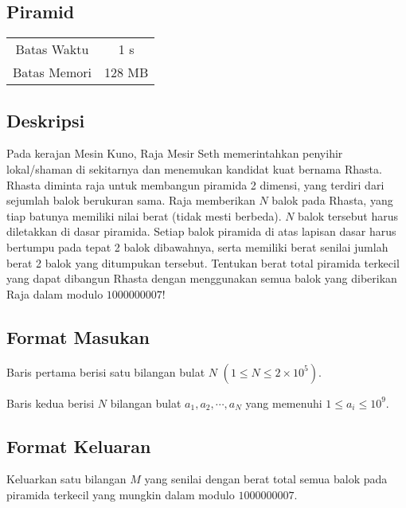 \documentclass{article}
\begin{document}
\begin{center}
    \section*{Piramid} %

    \begin{tabular}{ | c c | }
        \hline
        Batas Waktu  & 1 s \\    %
        Batas Memori & 128 MB \\  %
        \hline
    \end{tabular}
\end{center}

\subsection*{Deskripsi}
Pada kerajan Mesin Kuno, Raja Mesir Seth memerintahkan penyihir lokal/shaman di sekitarnya dan menemukan kandidat kuat bernama Rhasta. Rhasta diminta raja untuk membangun piramida 2 dimensi, yang terdiri dari sejumlah balok berukuran sama. Raja memberikan $N$ balok pada Rhasta, yang tiap batunya memiliki nilai berat (tidak mesti berbeda). $N$ balok tersebut harus diletakkan di dasar piramida. Setiap balok piramida di atas lapisan dasar harus bertumpu pada tepat 2 balok dibawahnya, serta memiliki berat senilai jumlah berat 2 balok yang ditumpukan tersebut. Tentukan berat total piramida terkecil yang dapat dibangun Rhasta dengan menggunakan semua balok yang diberikan Raja dalam modulo $1000000007$!

\subsection*{Format Masukan}

Baris pertama berisi satu bilangan bulat $N$ $(1 \leq N \leq 2\times 10^5)$.

Baris kedua berisi $N$ bilangan bulat $a_1, a_2, \cdots, a_N$ yang memenuhi $1 \leq a_i \leq 10^9$.


\subsection*{Format Keluaran}
Keluarkan satu bilangan $M$ yang senilai dengan berat total semua balok pada piramida terkecil yang mungkin dalam modulo $1000000007$.
\end{document}
